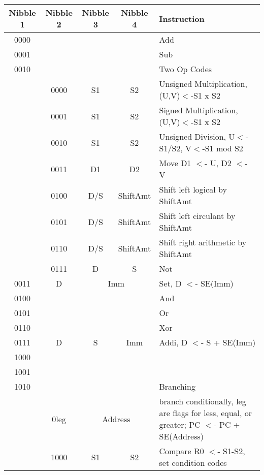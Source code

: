 
\begin{tabular}{|c|c|c|c|p{3in}|} \hline \hline
Nibble 1 & Nibble 2 & Nibble 3 & Nibble 4 & Instruction \\ \hline\hline
0000     &          &          &          & Add         \\
0001     &          &          &          & Sub         \\ \hline
0010     &          &          &          & Two Op Codes \\
         & 0000     & S1       & S2       & Unsigned Multiplication, (U,V)$<$-S1 x S2 \\
         & 0001     & S1       & S2       & Signed Multiplication, (U,V)$<$-S1 x S2 \\
         & 0010     & S1       & S2       & Unsigned Division, U$<$- S1/S2, V$<$-S1 mod S2 \\
         & 0011     & D1       & D2       & Move D1 $<$- U, D2 $<$- V \\
         & 0100     & D/S      & ShiftAmt & Shift left logical by ShiftAmt \\
         & 0101     & D/S      & ShiftAmt & Shift left circulant by ShiftAmt \\
         & 0110     & D/S      & ShiftAmt & Shift right arithmetic by ShiftAmt \\
         & 0111     & D        & S        & Not            \\ \cline{3-4}
0011     & D        & \multicolumn{2}{|c|}{Imm} & Set, D $<$- SE(Imm) \\ \hline\hline
0100     &          &          &          & And         \\
0101     &          &          &          & Or          \\ \hline
0110     &          &          &          & Xor         \\
0111     & D        & S        & Imm      & Addi, D $<$- S + SE(Imm) \\ \hline\hline
1000     &          &          &          & \\
1001     &          &          &          & \\ \hline
1010     &          &          &          & Branching \\ \cline{3-4}
         & 0leg     & \multicolumn{2}{|c|}{Address} & branch conditionally, leg are flags for less, equal, or greater; PC $<$- PC + SE(Address) \\ \cline{3-4}
         & 1000     & S1       & S2       & Compare R0 $<$- S1-S2, set condition codes \\ \cline{3-4}

\end{tabular}
